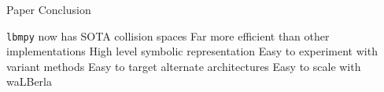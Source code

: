 \begin{frame}{Paper Conclusion}
  \begin{outline}
  \1 \lstinline{lbmpy} now has SOTA collision spaces
  \2 Far more efficient than other implementations
  \1 High level symbolic representation
  \2 Easy to experiment with variant methods
  \2 Easy to target alternate architectures
  \1 Easy to scale with waLBerla
\end{outline}
\end{frame}
